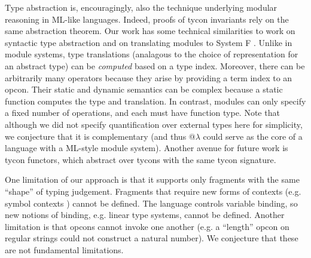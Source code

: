 \documentclass[10pt,preprint]{sigplanconf}
\begin{document}
Type abstraction is, encouragingly, also the technique underlying modular reasoning in ML-like languages. Indeed, proofs of tycon invariants rely on the same abstraction theorem. Our work has some technical similarities to work on syntactic type abstraction \cite{journals/toplas/GrossmanMZ00} and on translating modules to System F \cite{conf/tldi/RossbergRD10}.  Unlike in module systems, type translations (analagous to the choice of representation for an abstract type) can be \emph{computed} based on a type index. Moreover, there can be arbitrarily many operators because they arise by providing a term index to an opcon. Their static and dynamic semantics can be complex because a static function computes the type and translation. In contrast, modules can only specify a fixed number of operations, and each must have function type. Note that although we did not specify quantification over external types here for simplicity, we conjecture that it is complementary (and thus @$\lambda$ could serve as the core of a language with a ML-style module system). Another avenue for future work is tycon functors, which abstract over tycons with the same tycon signature. %

One limitation of our approach is that it supports only  fragments with the same ``shape'' of typing judgement. Fragments that require new forms of contexts (e.g. symbol contexts \cite{pfpl})  cannot be defined. The language controls variable binding, so new notions of binding, e.g. linear type systems, cannot be defined. Another limitation is that opcons cannot invoke one another (e.g. a ``length'' opcon on regular strings could not construct a natural number). We conjecture that these are not fundamental limitations. %



\end{document}
